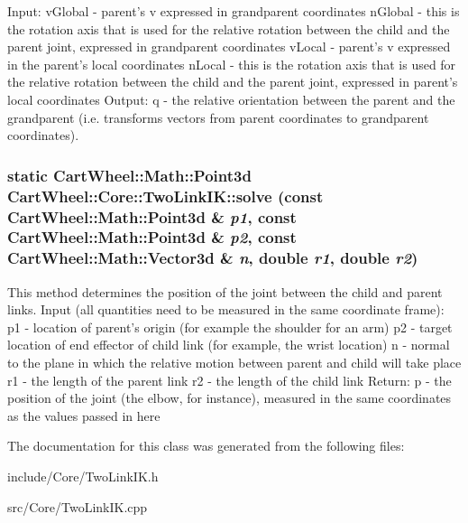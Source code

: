 Input: vGlobal -\/ parent's v expressed in grandparent coordinates nGlobal -\/ this is the rotation axis that is used for the relative rotation between the child and the parent joint, expressed in grandparent coordinates vLocal -\/ parent's v expressed in the parent's local coordinates nLocal -\/ this is the rotation axis that is used for the relative rotation between the child and the parent joint, expressed in parent's local coordinates Output: q -\/ the relative orientation between the parent and the grandparent (i.e. transforms vectors from parent coordinates to grandparent coordinates). \hypertarget{classCartWheel_1_1Core_1_1TwoLinkIK_a27c5a87ae2b76b3bcdc822e35059acce}{
\subsubsection[{solve}]{\setlength{\rightskip}{0pt plus 5cm}static {\bf CartWheel::Math::Point3d} CartWheel::Core::TwoLinkIK::solve (const {\bf CartWheel::Math::Point3d} \& {\em p1}, \/  const {\bf CartWheel::Math::Point3d} \& {\em p2}, \/  const {\bf CartWheel::Math::Vector3d} \& {\em n}, \/  double {\em r1}, \/  double {\em r2})}}
\label{classCartWheel_1_1Core_1_1TwoLinkIK_a27c5a87ae2b76b3bcdc822e35059acce}
This method determines the position of the joint between the child and parent links. Input (all quantities need to be measured in the same coordinate frame): p1 -\/ location of parent's origin (for example the shoulder for an arm) p2 -\/ target location of end effector of child link (for example, the wrist location) n -\/ normal to the plane in which the relative motion between parent and child will take place r1 -\/ the length of the parent link r2 -\/ the length of the child link Return: p -\/ the position of the joint (the elbow, for instance), measured in the same coordinates as the values passed in here 

The documentation for this class was generated from the following files:\begin{DoxyCompactItemize}
\item 
include/Core/TwoLinkIK.h\item 
src/Core/TwoLinkIK.cpp\end{DoxyCompactItemize}
